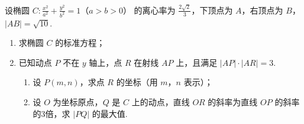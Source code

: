 \begin{problem}
设椭圆 \(C: \frac{x^2}{a^2} + \frac{y^2}{b^2} = 1\)（\(a > b > 0\)） 的离心率为 \(\frac{2\sqrt{2}}{3}\)，下顶点为 \(A\)，右顶点为 \(B\)，\(|AB| = \sqrt{10}\).

\begin{enumerate}
\item 求椭圆 \(C\) 的标准方程；
\item 已知动点 \(P\) 不在 \(y\) 轴上，点 \(R\) 在射线 \(AP\) 上，且满足 \(|AP| \cdot |AR| = 3\).
\begin{enumerate}
\item 设 \(P(m, n)\)，求点 \(R\) 的坐标（用 \(m\)，\(n\) 表示）；
\item 设 \(O\) 为坐标原点，\(Q\) 是 \(C\) 上的动点，直线 \(OR\) 的斜率为直线 \(OP\) 的斜率的3倍，求 \(|PQ|\) 的最大值.
\end{enumerate}
\end{enumerate}
\end{problem}

